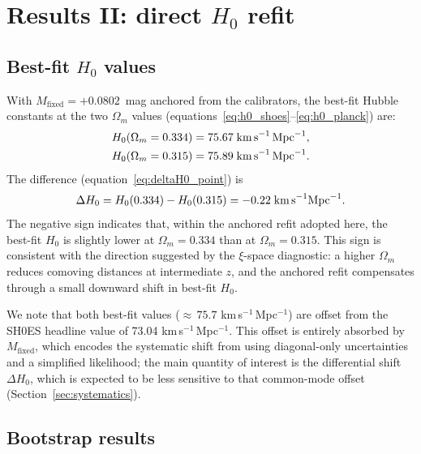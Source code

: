 \documentclass[fleqn,usenatbib,useAMS]{mnras}
\begin{document}
\section{Results II: direct $H_0$ refit}
\label{sec:results_refit}

\subsection{Best-fit $H_0$ values}

With $M_\mathrm{fixed} = +0.0802$~mag anchored from the calibrators,
the best-fit Hubble constants at the two $\Omega_m$ values
(equations~\ref{eq:h0_shoes}--\ref{eq:h0_planck}) are:
\begin{align}
  H_0(\Omega_m = 0.334) &= 75.67\;\text{km\,s}^{-1}\text{\,Mpc}^{-1},
  \label{eq:h0_shoes}\\
  H_0(\Omega_m = 0.315) &= 75.89\;\text{km\,s}^{-1}\text{\,Mpc}^{-1}.
  \label{eq:h0_planck}
\end{align}
The difference (equation~\ref{eq:deltaH0_point}) is
\begin{equation}
  \Delta H_0 = H_0(0.334) - H_0(0.315) = -0.22
    \;\text{km\,s}^{-1}\text{Mpc}^{-1}.
  \label{eq:deltaH0_point}
\end{equation}
The negative sign indicates that, within the anchored refit adopted
here, the best-fit $H_0$ is slightly lower at $\Omega_m = 0.334$
than at $\Omega_m = 0.315$.
This sign is consistent with the direction suggested by the
$\xi$-space diagnostic: a higher $\Omega_m$ reduces comoving
distances at intermediate $z$, and the anchored refit compensates
through a small downward shift in best-fit $H_0$.

We note that both best-fit values
(${\approx}\,75.7$ km\,s$^{-1}$\,Mpc$^{-1}$) are offset from
the SH0ES headline value of 73.04 km\,s$^{-1}$\,Mpc$^{-1}$.
This offset is entirely absorbed by $M_\mathrm{fixed}$,
which encodes the systematic shift from using diagonal-only
uncertainties and a simplified likelihood;
the main quantity of interest is the differential shift $\Delta H_0$,
which is expected to be less sensitive to that common-mode offset
(Section~\ref{sec:systematics}).

\subsection{Bootstrap results}
\end{document}
